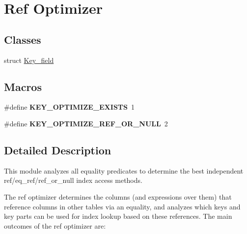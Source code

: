 \hypertarget{group__RefOptimizerModule}{}\section{Ref Optimizer}
\label{group__RefOptimizerModule}
\subsection*{Classes}
\begin{DoxyCompactItemize}
\item 
struct \mbox{\hyperlink{structKey__field}{Key\+\_\+field}}
\end{DoxyCompactItemize}
\subsection*{Macros}
\begin{DoxyCompactItemize}
\item 
\mbox{\label{group__RefOptimizerModule_ga58297bde0da4187801e718c29d5d6b5e}} 
\#define {\bfseries K\+E\+Y\+\_\+\+O\+P\+T\+I\+M\+I\+Z\+E\+\_\+\+E\+X\+I\+S\+TS}~1
\item 
\mbox{\label{group__RefOptimizerModule_ga0658a5d9673135da1c2f6463f0537405}} 
\#define {\bfseries K\+E\+Y\+\_\+\+O\+P\+T\+I\+M\+I\+Z\+E\+\_\+\+R\+E\+F\+\_\+\+O\+R\+\_\+\+N\+U\+LL}~2
\end{DoxyCompactItemize}


\subsection{Detailed Description}
This module analyzes all equality predicates to determine the best independent ref/eq\+\_\+ref/ref\+\_\+or\+\_\+null index access methods.

The \textquotesingle{}ref\textquotesingle{} optimizer determines the columns (and expressions over them) that reference columns in other tables via an equality, and analyzes which keys and key parts can be used for index lookup based on these references. The main outcomes of the \textquotesingle{}ref\textquotesingle{} optimizer are\+:


